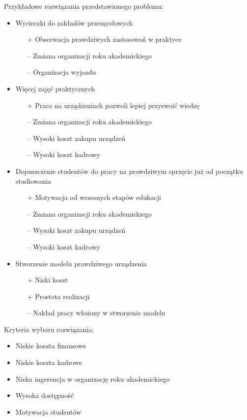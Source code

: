 \documentclass[11pt,titlepage,a4paper]{article}
\begin{document}
Przykładowe rozwiązania przedstawionego problemu:
\begin{itemize}
    \item Wycieczki do zakładów przemysłowych
          \begin{itemize}
              \item[+] Obserwacja prawdziwych zastosowań w praktyce
              \item[--] Zmiana organizacji roku akademickiego
              \item[--] Organizacja wyjazdu
          \end{itemize}
    \item Więcej zajęć praktycznych
          \begin{itemize}
              \item[+] Praca na urządzeniach pozwoli lepiej przyswoić wiedzę
              \item[--] Zmiana organizacji roku akademickiego
              \item[--] Wysoki koszt zakupu urządzeń
              \item[--] Wysoki koszt kadrowy
          \end{itemize}
    \item Dopuszczenie studentów do pracy na prawdziwym sprzęcie już od początku studiowania
          \begin{itemize}
              \item[+] Motywacja od wczesnych etapów edukacji
              \item[--] Zmiana organizacji roku akademickiego
              \item[--] Wysoki koszt zakupu urządzeń
              \item[--] Wysoki koszt kadrowy
          \end{itemize}
    \item Stworzenie modelu prawdziwego urządzenia
          \begin{itemize}
              \item[+] Niski koszt
              \item[+] Prostota realizacji
              \item[--] Nakład pracy włożony w stworzenie modelu
          \end{itemize}
\end{itemize}
Kryteria wyboru rozwiązania:
\begin{itemize}
    \item Niskie koszta finansowe
    \item Niskie koszta kadrowe
    \item Niska ingerencja w organizację roku akademickiego
    \item Wysoka dostępność
    \item Motywacja studentów
\end{itemize}
\end{document}
